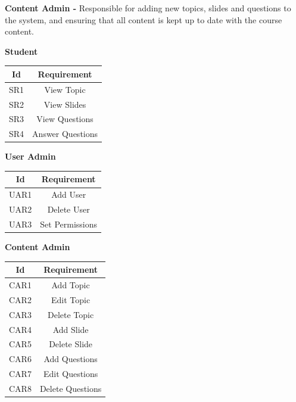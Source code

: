 \documentclass{l3proj}
\begin{document}
\textbf{Content Admin -} Responsible for adding new topics, slides and questions to the system, and ensuring that all content is kept up to date with the course content.

\textbf{Student}\\

\begin{center}
\begin{tabular}{|c|c|}
\hline \textbf{Id} & \textbf{Requirement}\\
\hline SR1 & View Topic\\
\hline SR2 & View Slides\\
\hline SR3 & View Questions\\
\hline SR4 & Answer Questions\\
\hline 
\end{tabular}
\end{center}

\textbf{User Admin}\\

\begin{center}
\begin{tabular}{|c|c|}
\hline \textbf{Id} & \textbf{Requirement}\\
\hline UAR1 & Add User\\
\hline UAR2 & Delete User\\
\hline UAR3 & Set Permissions\\
\hline 
\end{tabular}
\end{center}

\textbf{Content Admin}\\

\begin{center}
\begin{tabular}{|c|c|}
\hline \textbf{Id} & \textbf{Requirement}\\
\hline CAR1 & Add Topic\\
\hline CAR2 & Edit Topic\\
\hline CAR3 & Delete Topic\\
\hline CAR4 & Add Slide\\
\hline CAR5 & Delete Slide\\
\hline CAR6 & Add Questions\\
\hline CAR7 & Edit Questions\\
\hline CAR8 & Delete Questions\\
\hline 
\end{tabular}
\end{center}
\end{document}
